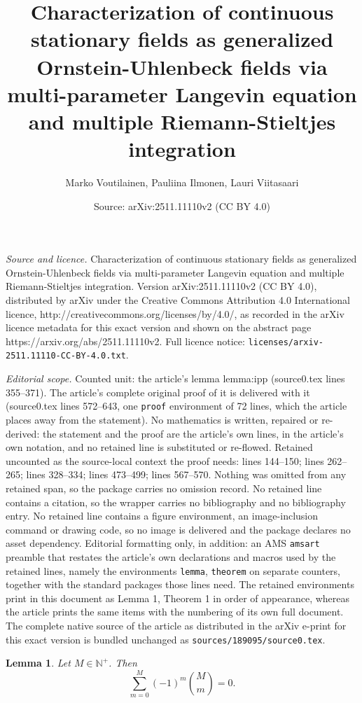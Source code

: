 \documentclass[10pt,a4paper]{amsart}
\title{Characterization of continuous stationary fields as generalized Ornstein-Uhlenbeck fields via multi-parameter Langevin equation and multiple Riemann-Stieltjes integration}
\author{Marko Voutilainen, Pauliina Ilmonen, Lauri Viitasaari}
\date{Source: arXiv:2511.11110v2 (CC BY 4.0)}
\newtheorem{lemma}{Lemma}
\begin{document}
\maketitle

\noindent\emph{Source and licence.} Characterization of continuous stationary fields as generalized Ornstein-Uhlenbeck fields via multi-parameter Langevin equation and multiple Riemann-Stieltjes integration. Version arXiv:2511.11110v2 (CC BY 4.0), distributed by arXiv under the Creative Commons Attribution 4.0 International licence, http://creativecommons.org/licenses/by/4.0/, as recorded in the arXiv licence metadata for this exact version and shown on the abstract page https://arxiv.org/abs/2511.11110v2. Full licence notice: \texttt{licenses/arxiv-2511.11110-CC-BY-4.0.txt}.\par\smallskip

\noindent\textit{Editorial scope.} Counted unit: the article's lemma lemma:ipp (source0.tex lines 355--371). The article's complete original proof of it is delivered with it (source0.tex lines 572--643, one \texttt{proof} environment of 72 lines, which the article places away from the statement). No mathematics is written, repaired or re-derived: the statement and the proof are the article's own lines, in the article's own notation, and no retained line is substituted or re-flowed.  Retained uncounted as the source-local context the proof needs: lines 144--150; lines 262--265; lines 328--334; lines 473--499; lines 567--570.  Nothing was omitted from any retained span, so the package carries no omission record.  No retained line contains a citation, so the wrapper carries no bibliography and no bibliography entry.  No retained line contains a figure environment, an image-inclusion command or drawing code, so no image is delivered and the package declares no asset dependency.  Editorial formatting only, in addition: an AMS \texttt{amsart} preamble that restates the article's own declarations and macros used by the retained lines, namely the environments \texttt{lemma}, \texttt{theorem} on separate counters, together with the standard packages those lines need.  The retained environments print in this document as Lemma 1, Theorem 1 in order of appearance, whereas the article prints the same items with the numbering of its own full document.  The complete native source of the article as distributed in the arXiv e-print for this exact version is bundled unchanged as \texttt{sources/189095/source0.tex}.
\begin{lemma}
\label{binomial}
Let $M\in\mathbb{N}^+$. Then
\begin{equation*}
\sum_{m=0}^M (-1)^m\binom{M}{m} = 0.
\end{equation*}
\end{lemma}
\end{document}
